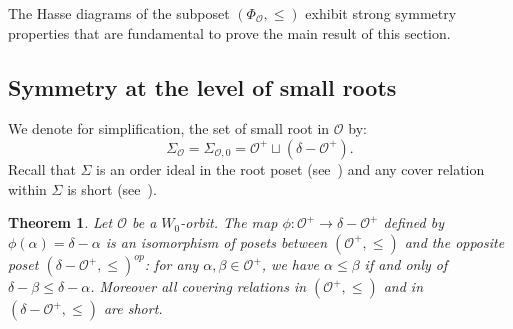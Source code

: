 \documentclass{amsart}
\newtheorem{Theorem}{Theorem}[section]
\theoremstyle{definition}
\newcommand{\mo}{\mathcal{O}}
\begin{document}

The Hasse diagrams of the subposet $(\Phi_{\mo},\leq)$  exhibit strong symmetry properties that are fundamental to prove the main result of this section. 

\subsection*{Symmetry at the level of small roots} We denote for simplification, the set of small root in $\mo$ by:
$$
\Sigma_{\mo}=\Sigma_{\mo,0}=\mo^+\sqcup (\delta-\mo^+).
$$
Recall that $\Sigma$ is an order ideal in the root poset (see~\cite[Corollary~4.7.7]{BB}) and any cover relation within $\Sigma$ is short (see~\cite[Lemma~4.7.5 and Theorem~4.7.6]{BB}).

\begin{Theorem}\label{th:iso1} Let $\mo$ be a $W_0$-orbit. 
The map $\phi: \mo^+ \to \delta - \mo^+$ defined by $\phi(\alpha) = \delta - \alpha$ is an isomorphism of posets between $(\mo^+, \leq)$ and the opposite poset $(\delta - \mo^+, \leq)^{op}$: for any $\alpha, \beta \in \mo^+$, we have $\alpha \leq \beta$ if and only of  $\delta - \beta \leq \delta - \alpha$. Moreover all covering relations in $(\mo^+,\leq)$ and in $(\delta - \mo^+, \leq)$ are short.
\end{Theorem}
\end{document}
